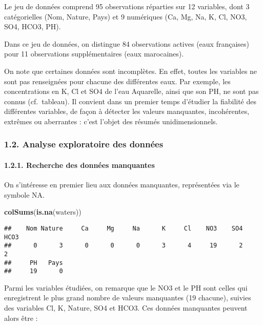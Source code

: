 \documentclass[]{article}
\newenvironment{Shaded}{\begin{snugshade}}{\end{snugshade}}
\newcommand{\KeywordTok}[1]{\textcolor[rgb]{0.13,0.29,0.53}{\textbf{#1}}}
\newcommand{\NormalTok}[1]{#1}
\let\oldparagraph\paragraph
\renewcommand{\paragraph}[1]{\oldparagraph{#1}\mbox{}}
\begin{document}
Le jeu de données comprend 95 observations réparties sur 12 variables,
dont 3 catégorielles (Nom, Nature, Pays) et 9 numériques (Ca, Mg, Na, K,
Cl, NO3, SO4, HCO3, PH).

Dans ce jeu de données, on distingue 84 observations actives (eaux
françaises) pour 11 observations supplémentaires (eaux marocaines).

On note que certaines données sont incomplètes. En effet, toutes les
variables ne sont pas renseignées pour chacune des différentes eaux. Par
exemple, les concentrations en K, Cl et SO4 de l'eau Aquarelle, ainsi
que son PH, ne sont pas connus (cf.~tableau). Il convient dans un
premier temps d'étudier la fiabilité des différentes variables, de façon
à détecter les valeurs manquantes, incohérentes, extrêmes ou aberrantes
: c'est l'objet des résumés unidimensionnels.

\hypertarget{analyse-exploratoire-des-donnees}{\subsubsection{1.2.
Analyse exploratoire des
données}\label{analyse-exploratoire-des-donnees}}

\hypertarget{recherche-des-donnees-manquantes}{\paragraph{1.2.1.
Recherche des données
manquantes}\label{recherche-des-donnees-manquantes}}

On s'intéresse en premier lieu aux données manquantes, représentées via
le symbole NA.

\begin{Shaded}
\begin{Highlighting}[]
\KeywordTok{colSums}\NormalTok{(}\KeywordTok{is.na}\NormalTok{(waters))}
\end{Highlighting}
\end{Shaded}

\begin{verbatim}
##    Nom Nature     Ca     Mg     Na      K     Cl    NO3    SO4   HCO3 
##      0      3      0      0      0      3      4     19      2      2 
##     PH   Pays 
##     19      0
\end{verbatim}

Parmi les variables étudiées, on remarque que le NO3 et le PH sont
celles qui enregistrent le plus grand nombre de valeurs manquantes (19
chacune), suivies des variables Cl, K, Nature, SO4 et HCO3. Ces données
manquantes peuvent alors être :
\end{document}
